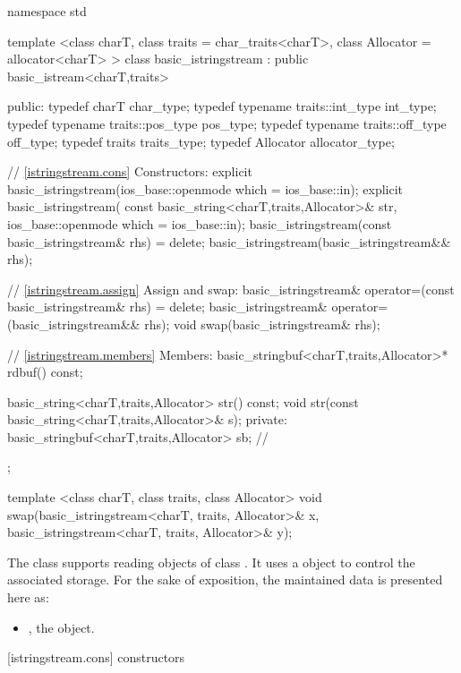 %
\begin{codeblock}
namespace std {
  template <class charT, class traits = char_traits<charT>,
        class Allocator = allocator<charT> >
  class basic_istringstream : public basic_istream<charT,traits> {
  public:
    typedef charT                     char_type;
    typedef typename traits::int_type int_type;
    typedef typename traits::pos_type pos_type;
    typedef typename traits::off_type off_type;
    typedef traits                    traits_type;
    typedef Allocator                 allocator_type;

    // \ref{istringstream.cons} Constructors:
    explicit basic_istringstream(ios_base::openmode which = ios_base::in);
    explicit basic_istringstream(
               const basic_string<charT,traits,Allocator>& str,
               ios_base::openmode which = ios_base::in);
    basic_istringstream(const basic_istringstream& rhs) = delete;
    basic_istringstream(basic_istringstream&& rhs);

    // \ref{istringstream.assign} Assign and swap:
    basic_istringstream& operator=(const basic_istringstream& rhs) = delete;
    basic_istringstream& operator=(basic_istringstream&& rhs);
    void swap(basic_istringstream& rhs);

    // \ref{istringstream.members} Members:
    basic_stringbuf<charT,traits,Allocator>* rdbuf() const;

    basic_string<charT,traits,Allocator> str() const;
    void str(const basic_string<charT,traits,Allocator>& s);
  private:
    basic_stringbuf<charT,traits,Allocator> sb; // \exposr
  };

  template <class charT, class traits, class Allocator>
  void swap(basic_istringstream<charT, traits, Allocator>& x,
            basic_istringstream<charT, traits, Allocator>& y);
}
\end{codeblock}

\pnum
The class
supports reading objects of class
.
It uses a
object to control the associated storage.
For the sake of exposition, the maintained data is presented here as:
\begin{itemize}
\item
{}, the  object.
\end{itemize}

[istringstream.cons]{ constructors}

